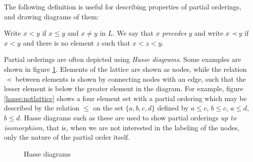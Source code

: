 \documentclass[12pt]{report}
\begin{document}
The following definition is useful for describing properties of partial orderings, and drawing diagrams of them:
\begin{defn}
    Write $x < y$ if $x \le y$ and $x \neq y$ in $L$. We say that $x$ 
    \emph{precedes} $y$ and write $x \prec y$ if $x < y$ and there is no 
    element $z$ such that $x < z < y$.
\end{defn}

Partial orderings are often depicted using \emph{Hasse diagrams}. Some examples are shown in figure \ref{hasse}. Elements of the lattice are shown as nodes, while the relation $\prec$ between elements is shown by connecting nodes with an edge, such that the lesser element is below the greater element in the diagram. For example, figure \ref{hasse:notlattice} shows a four element set with a partial ordering which may be described by the relation $\le$ on the set $\{a,b,c,d\}$ defined by $a \le c$, $b \le c$, $a \le d$, $b\le d$. Hasse diagrams such as these are used to show partial orderings \emph{up to isomorphism}, that is, when we are not interested in the labeling of the nodes, only the nature of the partial order itself. 
\begin{figure}
\begin{center}

%
\hfill
{}
\hfill
{}
\hfill
\caption{Hasse diagrams}
\label{hasse}
\end{center}
\end{figure}
\end{document}
